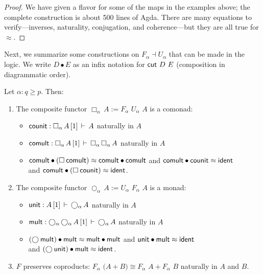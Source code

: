 \documentclass{drl-common/llncs}
\newcommand{\la}{\ensuremath{\dashv}}
\newcommand\F[2]{\ensuremath{F_{#1} \,\, #2}}
\newcommand\U[2]{\ensuremath{U_{#1} \,\, #2}}
\newcommand\coprd[2]{\ensuremath{#1 + #2}}
\newcommand\seq[3]{\ensuremath{#1 \, [ #2 ] \, \vdash \, #3}}
\newcommand\ident[1]{\ensuremath{\dsd{ident}_{#1}}}
\newcommand\cutsym{\ensuremath{\dsd{cut}}}
\newcommand\cut[2]{\ensuremath{{\cutsym \,\, #1 \,\, #2}}}
\newcommand\cuti{\ensuremath{\bullet}}
\newcommand\ap[2]{\ensuremath{#1 \approx #2}}
\newcommand\Bx[2]{\ensuremath{\Box_{#1} \, {#2}}}
\newcommand\Crc[2]{\ensuremath{\bigcirc_{#1} \, {#2}}}
\newcommand\iso{\cong}
\begin{document}
\begin{proof}
We have given a flavor for some of the maps in the examples above; the
complete construction is about 500 lines of Agda.  There are many
equations to verify---inverses, naturality, conjugation, and
coherence---but they are all true for \ap{}{}.
\end{proof}

Next, we summarize some constructions on $F_\alpha \la U_\alpha$ that
can be made in the logic. We write $D \cuti E$ as an infix notation for
\cut{D}{E} (composition in diagrammatic order).

\begin{lemma} \label{lem:constructionsonadjunctions}
Let $\alpha : q \ge p$.  Then:
\begin{enumerate}
\item The composite functor $\Bx{\alpha}{A} := \F{\alpha}{\U{\alpha}{A}}$ is a comonad:
\begin{itemize}
\item[] $\dsd{counit} : \seq{\Bx \alpha A}{1}{A}$ naturally in $A$
\item[] $\dsd{comult} : \seq{\Bx \alpha A}{1}{\Bx \alpha {\Bx \alpha A}}$
  naturally in $A$
\item[] 
 \ap{\dsd{comult} \cuti (\Bx{}{\dsd{comult}})}{\dsd{comult} \cuti
   \dsd{comult}}
and \ap{\dsd{comult} \cuti \dsd{counit}}{\ident{}} \\
and \ap{\dsd{comult} \cuti (\Bx{}{\dsd{counit}})}{\ident{}}.  
\end{itemize}

\item The composite functor $\Crc{\alpha}{A} := \U{\alpha}{\F{\alpha}{A}}$ is a monad:
\begin{itemize}
\item[] $\dsd{unit} : \seq{A}{1}{\Crc \alpha A}$ naturally in $A$
\item[] $\dsd{mult} : \seq{\Crc \alpha {\Crc \alpha A}}{1}{\Crc \alpha A}$
  naturally in $A$
\item[] 
 \ap{(\Crc{}{\dsd{mult}}) \cuti \dsd{mult} }{\dsd{mult} \cuti
   \dsd{mult}}
and \ap{\dsd{unit} \cuti \dsd{mult}}{\ident{}} \\
and \ap{(\Crc{}{\dsd{unit}}) \cuti \dsd{mult}}{\ident{}}.  
\end{itemize}

\item $F$ preserves coproducts: $\F \alpha (\coprd A B) \iso \coprd {\F
  \alpha A} {\F \alpha B}$ naturally in $A$ and $B$.
\end{enumerate}
\end{lemma}
\end{document}
